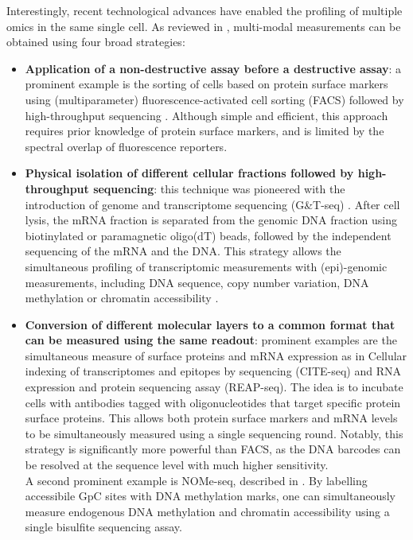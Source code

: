 Interestingly, recent technological advances have enabled the profiling of multiple omics in the same single cell. As reviewed in \cite{Stuart2019,Chappell2018}, multi-modal measurements can be obtained using four broad strategies:
\begin{itemize}
	
	\item \textbf{Application of a non-destructive assay before a destructive assay}: a prominent example is the sorting of cells based on protein surface markers using (multiparameter) fluorescence-activated cell sorting (FACS) followed by high-throughput sequencing \cite{Paul2015}. Although simple and efficient, this approach requires prior knowledge of protein surface markers, and is limited by the spectral overlap of fluorescence reporters.

	\item \textbf{Physical isolation of different cellular fractions followed by high-throughput sequencing}: this technique was pioneered with the introduction of genome and transcriptome sequencing (G\&T-seq) \cite{Macaulay2015}. After cell lysis, the mRNA fraction is separated from the genomic DNA fraction using biotinylated or paramagnetic oligo(dT) beads, followed by the independent sequencing of the mRNA and the DNA. This strategy allows the simultaneous profiling of transcriptomic measurements with (epi)-genomic measurements, including DNA sequence, copy number variation, DNA methylation or chromatin accessibility \cite{Macaulay2015,Hou2016,Angermueller2016,Hu2016}.

	\item \textbf{Conversion of different molecular layers to a common format that can be measured using the same readout}: prominent examples are the simultaneous measure of surface proteins and mRNA expression as in Cellular indexing of transcriptomes and epitopes by sequencing (CITE-seq\cite{Stoeckius2017}) and RNA expression and protein sequencing assay (REAP-seq\cite{Peterson2017}). The idea is to incubate cells with antibodies tagged with oligonucleotides that target specific protein surface proteins. This allows both protein surface markers and mRNA levels to be simultaneously measured using a single sequencing round. Notably, this strategy is significantly more powerful than FACS, as the DNA barcodes can be resolved at the sequence level with much higher sensitivity.\\
	A second prominent example is NOMe-seq, described in . By labelling accessibile GpC sites with DNA methylation marks, one can simultaneously measure endogenous DNA methylation and chromatin accessibility using a single bisulfite sequencing assay.
\end{itemize}

